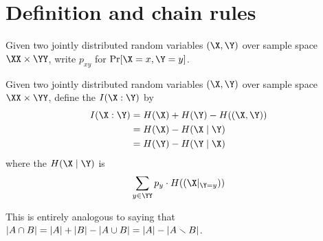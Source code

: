 \documentclass[class=co432,notes,tikz]{agony}
\begin{document}
\section{Definition and chain rules}
\begin{notation}
  Given two jointly distributed random variables $(\X,\Y)$ over sample space
  $\XX \times \YY$, write $p_{xy}$ for $\Pr[\X = x, \Y = y]$.
\end{notation}
\begin{defn}
  Given two jointly distributed random variables $(\X,\Y)$ over sample space
  $\XX \times \YY$, define the  $I(\X : \Y)$ by
  \begin{align*}
    I(\X : \Y) & = H(\X) + H(\Y) - H((\X,\Y)) \\
               & = H(\X) - H(\X \mid \Y)      \\
               & = H(\Y) - H(\Y \mid \X)
  \end{align*}
  where the  $H(\X \mid \Y)$ is
  \[ \sum_{y \in \YY} p_y \cdot H((\X|_{\Y=y})) \]
\end{defn}
This is entirely analogous to saying that
$\abs{A \cap B} = \abs{A} + \abs{B} - \abs{A \cup B} = \abs{A} - \abs{A \smallsetminus B}$.
\end{document}
